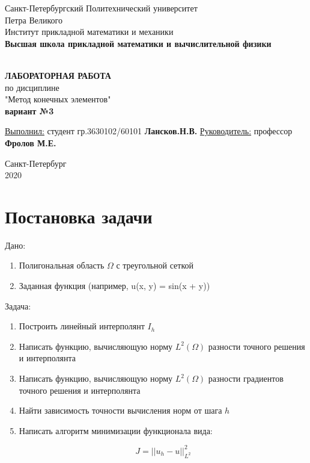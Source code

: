 \documentclass[12pt]{article}
\renewcommand{\listoffigures}{\begingroup  %
\tocsection
\tocfile{\listfigurename}{lof}
\endgroup}
\renewcommand{\listoftables}{\begingroup  %
\tocsection
\tocfile{\listtablename}{lot}
\endgroup}
\begin{document}
\begin{titlepage}
	\center
		Санкт-Петербургский Политехнический 
		университет \\ Петра Великого\\
		Институт прикладной математики и механики
		\\ \textbf{Высшая школа прикладной математики и вычислительной физики}

	\vfill ~
	\textbf{
		\\ \large ЛАБОРАТОРНАЯ РАБОТА
	}
	\\ по дисциплине
	\\ "Метод конечных элементов"
    \\ \textbf{вариант №3}
	\vfill ~
    
    
    \begin{flushleft}
    \underline{Выполнил:}  \hspace{\fill} студент гр.3630102/60101 \textbf{Лансков.Н.В.} \linebreak[2]
	\underline{Руководитель:} \hspace{\fill} профессор \textbf{Фролов М.Е.} \\ 
    \end{flushleft}
    

\vfill

{\large}	Санкт-Петербург
\\ 2020
\end{titlepage}


\tableofcontents
\pagebreak


\section{Постановка задачи}

\quad  Дано:
\begin{enumerate}
\item Полигональная область $\Omega$ с треугольной сеткой
\item Заданная функция (например, u(x, y) = sin(x + y))
\end{enumerate} 

Задача:

\begin{enumerate}
\item Построить линейный интерполянт $I_h$
\item Написать функцию, вычисляющую норму $L^2(\Omega)$ разности точного решения и интерполянта
\item Написать функцию, вычисляющую норму $L^2(\Omega)$ разности градиентов точного решения и интерполянта 
\item Найти зависимость точности вычисления норм от шага $h$
\item Написать алгоритм минимизации функционала вида:

\begin{equation}
J = ||u_h - u||_{L^2}^2
\end{equation}

\end{enumerate} 
\end{document}

